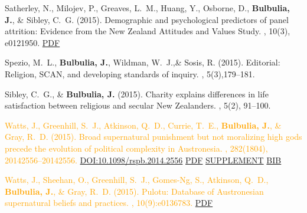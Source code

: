 \documentclass{article}
\begin{document}
\begin{thebibliography}{99}
Satherley, N., Milojev, P., Greaves, L.~M., Huang, Y., Osborne, D., {\bf Bulbulia, J.}, \& Sibley, C.~G. (2015).
\newblock Demographic and psychological predictors of panel attrition: Evidence
  from the {N}ew {Z}ealand {A}ttitudes and {V}alues {S}tudy.
, 10(3), e0121950. 
\href{https://www.dropbox.com/s/t5j2oyalr97f5aj/journal.pone.0121950.pdf?dl=0}{PDF} %


Spezio, M.~L., {\bf Bulbulia, J.}, Wildman, W.~J.,\& Sosis, R. (2015). Editorial:
\newblock Religion, {SCAN}, and developing standards of inquiry.
, 5(3),179--181.
 

Sibley, C.~G., \& {\bf Bulbulia, J.} (2015).
\newblock Charity explains differences in life satisfaction between religious
  and secular New Zealanders.
, 5(2), 91--100.


\textcolor{Orange}{Watts, J., Greenhill, S.~J., Atkinson, Q.~D., Currie, T.~E., {\bf Bulbulia, J.}, \&
  Gray, R.~D. (2015).
\newblock Broad supernatural punishment but not moralizing high gods precede
  the evolution of political complexity in Austronesia.
, 282(1804), 20142556--20142556.
\href{https://doi.org/10.1098/rspb.2014.2556}{DOI:10.1098/rspb.2014.2556}}
\href{https://www.dropbox.com/s/kx3br0orme0dztr/20142556.full.pdf?dl=0}{PDF} \href{https://www.dropbox.com/s/xlj936kpv3obvhc/rspb20142556supp1.pdf?dl=0}{SUPPLEMENT} 
\href{https://www.dropbox.com/s/jpwqqqtqiomvnqe/broad-supernatural-punishment-but-not-moralizing-high-gods-precede-the-evolution-of-political-complexity-in-austronesia.bib?dl=0}{BIB} 


\textcolor{Orange}{Watts, J., Sheehan, O., Greenhill, S.~J., Gomes-Ng, S., Atkinson, Q.~D.,
  {\bf Bulbulia, J.}, \& Gray, R.~D. (2015).
\newblock Pulotu: Database of Austronesian supernatural beliefs and practices. 
, 10(9):e0136783.}
 \href{https://www.dropbox.com/s/x7nw0co4clo1lkb/journal.pone.0136783.pdf?dl=0}{PDF}



\end{thebibliography}
\end{document}
